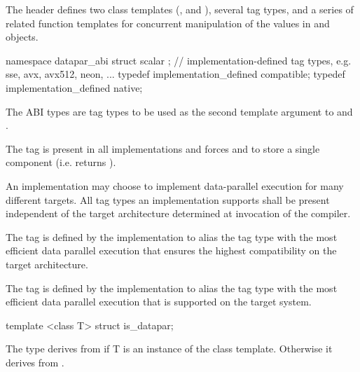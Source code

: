 

\pnum
The header  defines two class templates (\datapar, and \mask), several tag types, and a series of related function templates for concurrent manipulation of the values in \datapar and \mask objects.

\begin{itemdecl}
namespace datapar_abi {
struct scalar {};
// implementation-defined tag types, e.g. sse, avx, avx512, neon, ...
typedef implementation_defined compatible;
typedef implementation_defined native;
}
\end{itemdecl}
\begin{itemdescr}
  \pnum
  The ABI types are tag types to be used as the second template argument to \datapar and \mask.

  \pnum
  The  tag is present in all implementations and forces \datapar and \mask to store a single component (i.e. \datapar{} returns ).

  \pnum
  An implementation may choose to implement data-parallel execution for many different targets.
  All tag types an implementation supports shall be present independent of the target architecture determined at invocation of the compiler.

  \pnum
  The  tag is defined by the implementation to alias the tag type with the most efficient data parallel execution that ensures the highest compatibility on the target architecture.

  \pnum
  The  tag is defined by the implementation to alias the tag type with the most efficient data parallel execution that is supported on the target system.
\end{itemdescr}

\begin{itemdecl}
template <class T> struct is_datapar;
\end{itemdecl}
\begin{itemdescr}
  \pnum The  type derives from  if \type T is an instance of the \datapar class template.
  Otherwise it derives from .
\end{itemdescr}

